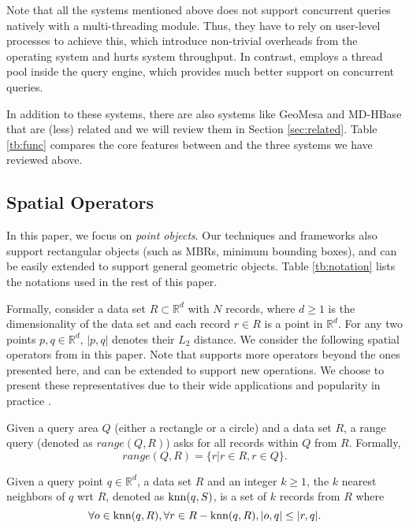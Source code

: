  Note that all the systems mentioned above does not
support concurrent queries natively with a multi-threading module. Thus,
they have to rely on user-level processes to achieve this, which introduce
non-trivial overheads from the operating system and hurts system throughput.
In contrast, \name employs a thread pool inside the query engine, which
provides much better support on concurrent queries.

In addition to these systems, there are also systems like GeoMesa and MD-HBase
that are (less) related and we will review them in Section \ref{sec:related}.
Table \ref{tb:func} compares the core features between \name and the three systems
we have reviewed above.

\subsection{Spatial Operators}
\label{sec:operators}
In this paper, we focus on {\em point objects}. Our techniques and
frameworks also support rectangular objects (such as MBRs, minimum
bounding boxes), and can be easily extended to support general
geometric objects. Table \ref{tb:notation} lists the notations
used in the rest of this paper.

Formally, consider a data set $R\subset \mathbb{R}^d$ with $N$
records, where $d\ge 1$ is the dimensionality of the data set and each
record $r\in R$ is a point in $\mathbb{R}^d$. For any two points
$p, q\in \mathbb{R}^d$, $|p, q|$ denotes their $L_2$ distance. We
consider the following spatial operators from \name in this
paper. Note that \name supports more operators beyond the ones
presented here, and can be extended to support new operations. We
choose to present these representatives due to their wide
applications and popularity in practice \cite{Samet:2005:FMM:1076819}.

\vspace{-3mm}
\begin{definition}
\label{def:range}
Given a query area $Q$ (either a rectangle or a circle) and a data set
$R$, a range query (denoted as $range(Q, R)$) asks for all records
within $Q$ from $R$. Formally,
\[ range(Q, R) = \{r|r \in R, r \in Q\}. \]
\end{definition}

\vspace{-7mm}
\begin{definition}[$k$NN Query]
  \label{def:knn}
  Given a query point $q\in \mathbb{R}^d$, a data set $R$ and an
  integer $k\ge 1$, the $k$ nearest neighbors of $q$ wrt $R$, denoted
  as $\operatorname{knn}(q, S)$, is a set of $k$ records from $R$ where
\[\forall o \in \operatorname{knn}(q, R), \forall r \in R - \operatorname{knn}(q, R), |o, q| \leq
|r, q|.\]
\end{definition}

